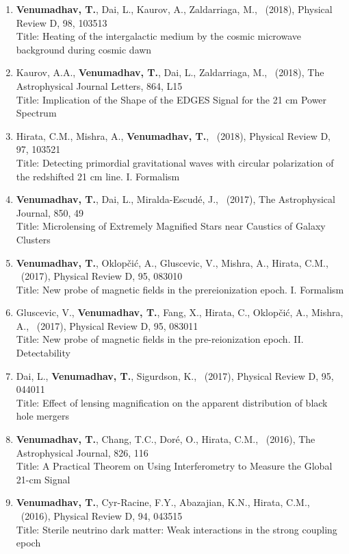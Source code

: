 \documentclass{article}
\newlength{\cvindent}
\newenvironment{cvlist}{%
  \begin{list}{}{%
    \setlength{\leftmargin}{\cvindent}%
    \setlength{\rightmargin}{0pt}%
    \setlength{\topsep}{0pt}%
    \setlength{\partopsep}{0pt}%
    \setlength{\parsep}{0pt}%
    \setlength{\itemsep}{0pt}%
  }%
  \item\relax
}{%
  \end{list}
}
\begin{document}
\begin{cvlist}
\begin{enumerate}[leftmargin=*,itemsep=0.32em,topsep=0.3em]
Title: Probing Dark Matter Subhalos in Galaxy Clusters Using Highly Magnified Stars
\item \textbf{Venumadhav, T.}, Dai, L., Kaurov, A., Zaldarriaga, M., \ (2018), Physical Review D, 98, 103513 \\
Title: Heating of the intergalactic medium by the cosmic microwave background during cosmic dawn
\item Kaurov, A.A., \textbf{Venumadhav, T.}, Dai, L., Zaldarriaga, M., \ (2018), The Astrophysical Journal Letters, 864, L15 \\
Title: Implication of the Shape of the EDGES Signal for the 21 cm Power Spectrum
\item Hirata, C.M., Mishra, A., \textbf{Venumadhav, T.}, \ (2018), Physical Review D, 97, 103521 \\
Title: Detecting primordial gravitational waves with circular polarization of the redshifted 21 cm line. I. Formalism
\item \textbf{Venumadhav, T.}, Dai, L., Miralda-Escudé, J., \ (2017), The Astrophysical Journal, 850, 49 \\
Title: Microlensing of Extremely Magnified Stars near Caustics of Galaxy Clusters
\item \textbf{Venumadhav, T.}, Oklopčić, A., Gluscevic, V., Mishra, A., Hirata, C.M., \ (2017), Physical Review D, 95, 083010 \\
Title: New probe of magnetic fields in the prereionization epoch. I. Formalism
\item Gluscevic, V., \textbf{Venumadhav, T.}, Fang, X., Hirata, C., Oklopčić, A., Mishra, A., \ (2017), Physical Review D, 95, 083011 \\
Title: New probe of magnetic fields in the pre-reionization epoch. II. Detectability
\item Dai, L., \textbf{Venumadhav, T.}, Sigurdson, K., \ (2017), Physical Review D, 95, 044011 \\
Title: Effect of lensing magnification on the apparent distribution of black hole mergers
\item \textbf{Venumadhav, T.}, Chang, T.C., Doré, O., Hirata, C.M., \ (2016), The Astrophysical Journal, 826, 116 \\
Title: A Practical Theorem on Using Interferometry to Measure the Global 21-cm Signal
\item \textbf{Venumadhav, T.}, Cyr-Racine, F.Y., Abazajian, K.N., Hirata, C.M., \ (2016), Physical Review D, 94, 043515 \\
Title: Sterile neutrino dark matter: Weak interactions in the strong coupling epoch

\end{enumerate}
\end{cvlist}
\end{document}
